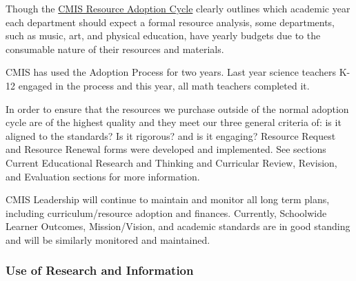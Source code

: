 \begin{findings}
Though the \href{https://docs.google.com/document/d/1hh1nLUlJgg1hd7s6aG3u3We0L6o7Wg_ECdjc2f6DcT8/edit}{CMIS Resource Adoption Cycle} clearly outlines which academic year each department should expect a formal resource analysis, some departments, such as music, art, and physical education, have yearly budgets due to the consumable nature of their resources and materials. 

CMIS has used the Adoption Process for two years. Last year science teachers K-12 engaged in the process and this year, all math teachers completed it. 

In order to ensure that the resources we purchase outside of the normal adoption cycle are of the highest quality and they meet our three general criteria of: is it aligned to the standards? Is it rigorous? and is it engaging? Resource Request and Resource Renewal forms were developed and implemented. See sections Current Educational Research and Thinking and Curricular Review, Revision, and Evaluation sections for more information. 


CMIS Leadership will continue to maintain and monitor all long term plans, including curriculum/resource adoption and finances. Currently, Schoolwide Learner Outcomes, Mission/Vision, and academic standards are in good standing and will be similarly monitored and maintained. 
\end{findings}

\subsubsection{Use of Research and Information}



